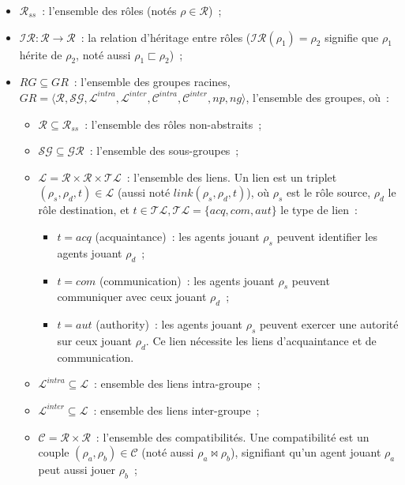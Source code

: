 \documentclass[francais,ROIA,Unicode,manuscript]{cedram}
\begin{document}
\begin{itemize}
    \item $\mathcal{R}_{ss}$~: l'ensemble des rôles (notés $\rho \in \mathcal{R}$)~;
    \item $\mathcal{IR}: \mathcal{R} \rightarrow \mathcal{R}$~: la relation d'héritage entre rôles ($\mathcal{IR}(\rho_1) = \rho_2$ signifie que $\rho_1$ hérite de $\rho_2$, noté aussi $\rho_1 \sqsubset \rho_2$)~;
    \item $RG \subseteq GR$~: l'ensemble des groupes racines, $GR = \langle \mathcal{R}, \mathcal{SG}, \mathcal{L}^{intra}, \mathcal{L}^{inter}, \mathcal{C}^{intra}, \mathcal{C}^{inter}, np, ng \rangle$, l'ensemble des groupes, où~:
          \begin{itemize}
              \item $\mathcal{R} \subseteq \mathcal{R}_{ss}$~: l'ensemble des rôles non-abstraits~;
              \item $\mathcal{SG} \subseteq \mathcal{GR}$~: l'ensemble des sous-groupes~;
              \item $\mathcal{L} = \mathcal{R} \times \mathcal{R} \times \mathcal{TL}$~: l'ensemble des liens. Un lien est un triplet $(\rho_s,\rho_d,t) \in \mathcal{L}$ (aussi noté $link(\rho_s,\rho_d,t)$), où $\rho_s$ est le rôle source, $\rho_d$ le rôle destination, et $t \in \mathcal{TL}, \mathcal{TL} = \{acq, com, aut\}$ le type de lien~:
                    \begin{itemize}
                        \item $t = acq$ (acquaintance)~: les agents jouant $\rho_s$ peuvent identifier les agents jouant $\rho_d$~;
                        \item $t = com$ (communication)~: les agents jouant $\rho_s$ peuvent communiquer avec ceux jouant $\rho_d$~;
                        \item $t = aut$ (authority)~: les agents jouant $\rho_s$ peuvent exercer une autorité sur ceux jouant $\rho_d$. Ce lien nécessite les liens d'acquaintance et de communication.
                    \end{itemize}
              \item $\mathcal{L}^{intra} \subseteq \mathcal{L}$~: ensemble des liens intra-groupe~;
              \item $\mathcal{L}^{inter} \subseteq \mathcal{L}$~: ensemble des liens inter-groupe~;
              \item $\mathcal{C} = \mathcal{R} \times \mathcal{R}$~: l'ensemble des compatibilités. Une compatibilité est un couple $(\rho_a, \rho_b) \in \mathcal{C}$ (noté aussi $\rho_a \bowtie \rho_b$), signifiant qu'un agent jouant $\rho_a$ peut aussi jouer $\rho_b$~;

\end{itemize}
\end{itemize}
\end{document}
